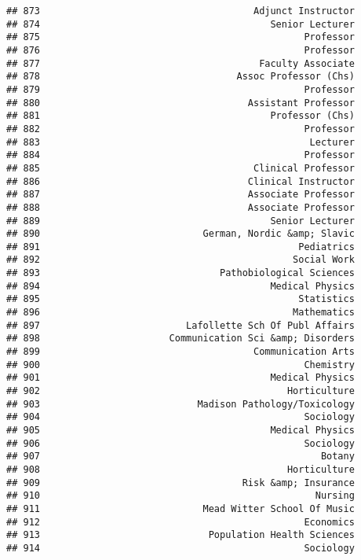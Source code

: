 \documentclass[
]{article}
\begin{document}
\begin{verbatim}
## 873                                      Adjunct Instructor
## 874                                         Senior Lecturer
## 875                                               Professor
## 876                                               Professor
## 877                                       Faculty Associate
## 878                                   Assoc Professor (Chs)
## 879                                               Professor
## 880                                     Assistant Professor
## 881                                         Professor (Chs)
## 882                                               Professor
## 883                                                Lecturer
## 884                                               Professor
## 885                                      Clinical Professor
## 886                                     Clinical Instructor
## 887                                     Associate Professor
## 888                                     Associate Professor
## 889                                         Senior Lecturer
## 890                             German, Nordic &amp; Slavic
## 891                                              Pediatrics
## 892                                             Social Work
## 893                                Pathobiological Sciences
## 894                                         Medical Physics
## 895                                              Statistics
## 896                                             Mathematics
## 897                          Lafollette Sch Of Publ Affairs
## 898                       Communication Sci &amp; Disorders
## 899                                      Communication Arts
## 900                                               Chemistry
## 901                                         Medical Physics
## 902                                            Horticulture
## 903                            Madison Pathology/Toxicology
## 904                                               Sociology
## 905                                         Medical Physics
## 906                                               Sociology
## 907                                                  Botany
## 908                                            Horticulture
## 909                                    Risk &amp; Insurance
## 910                                                 Nursing
## 911                             Mead Witter School Of Music
## 912                                               Economics
## 913                              Population Health Sciences
## 914                                               Sociology

\end{verbatim}
\end{document}
